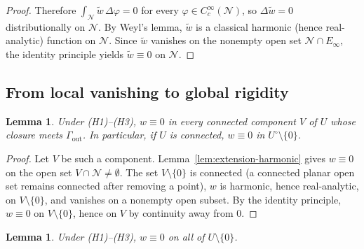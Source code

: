 \documentclass[11pt]{article}
\newtheorem{lemma}[theorem]{Lemma}
\newcommand{\1}{\mathbf 1}
\begin{document}
\begin{proof}
Therefore $\int_{\mathcal N}\tilde w\,\Delta\varphi=0$ for every $\varphi\in C_c^\infty(\mathcal N)$, so
$\Delta\tilde w=0$ distributionally on $\mathcal N$. By Weyl's lemma, $\tilde w$ is a
classical harmonic (hence real-analytic) function on $\mathcal N$. Since $\tilde w$
vanishes on the nonempty open set $\mathcal N\cap E_\infty$, the identity principle yields
$\tilde w\equiv 0$ on $\mathcal N$.
\end{proof}

\subsection{From local vanishing to global rigidity}

\begin{lemma}\label{lem:w-zero-in-U}
Under (H1)--(H3), $w\equiv 0$ in every connected component $V$ of $U$ whose closure meets
$\Gamma_{\mathrm{out}}$. In particular, if $U$ is connected, $w\equiv 0$ in
$U^\circ\setminus\{0\}$.
\end{lemma}

\begin{proof}
Let $V$ be such a component. Lemma~\ref{lem:extension-harmonic} gives $w\equiv 0$ on the
open set $V\cap\mathcal N\ne\emptyset$. The set $V\setminus\{0\}$ is connected (a
connected planar open set remains connected after removing a point), $w$ is harmonic, hence
real-analytic, on $V\setminus\{0\}$, and vanishes on a nonempty open subset. By the identity
principle, $w\equiv 0$ on $V\setminus\{0\}$, hence on $V$ by continuity away from $0$.
\end{proof}

\begin{lemma}\label{lem:all-components}
Under (H1)--(H3), $w\equiv 0$ on all of $U\setminus\{0\}$.
\end{lemma}
\end{document}
